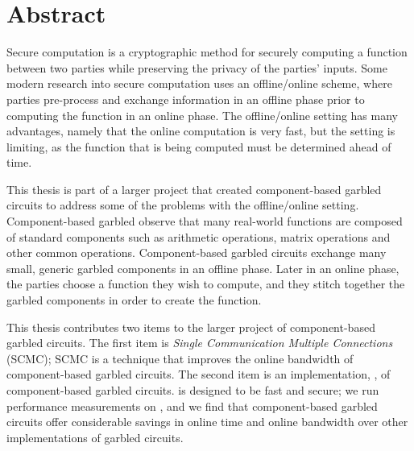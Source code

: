 
\chapter*{Abstract}

Secure computation is a cryptographic method for securely computing a function between two parties while preserving the privacy of the parties' inputs.
Some modern research into secure computation uses an offline/online scheme, where parties pre-process and exchange information in an offline phase prior to computing the function in an online phase. 
The offline/online setting has many advantages, namely that the online computation is very fast, but the setting is limiting, as the function that is being computed must be determined ahead of time.

This thesis is part of a larger project that created component-based garbled circuits to address some of the problems with the offline/online setting.
Component-based garbled observe that many real-world functions are composed of standard components such as arithmetic operations, matrix operations and other common operations.
Component-based garbled circuits exchange many small, generic garbled components in an offline phase. 
Later in an online phase, the parties choose a function they wish to compute, and they stitch together the garbled components in order to create the function.

This thesis contributes two items to the larger project of component-based garbled circuits.
The first item is \textit{Single Communication Multiple Connections} (SCMC); SCMC is a technique that improves the online bandwidth of component-based garbled circuits.
The second item is an implementation, \CompGC, of component-based garbled circuits.
\CompGC is designed to be fast and secure; we run performance measurements on \CompGC, and we find that component-based garbled circuits offer considerable savings in online time and online bandwidth over other implementations of garbled circuits. 
